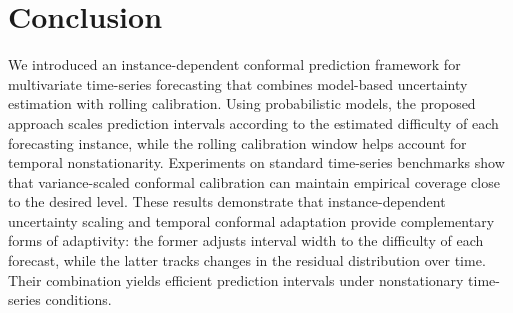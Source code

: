\section{Conclusion}
We introduced an instance-dependent conformal prediction framework for multivariate time-series forecasting that combines model-based uncertainty estimation with rolling calibration. Using probabilistic models, the proposed approach scales prediction intervals according to the estimated difficulty of each forecasting instance, while the rolling calibration window helps account for temporal nonstationarity. Experiments on standard time-series benchmarks show that variance-scaled conformal calibration can maintain empirical coverage close to the desired level.
These results demonstrate that instance-dependent uncertainty scaling and temporal conformal adaptation provide complementary forms of adaptivity: the former adjusts interval width to the difficulty of each forecast, while the latter tracks changes in the residual distribution over time. Their combination yields efficient prediction intervals under nonstationary time-series conditions.


